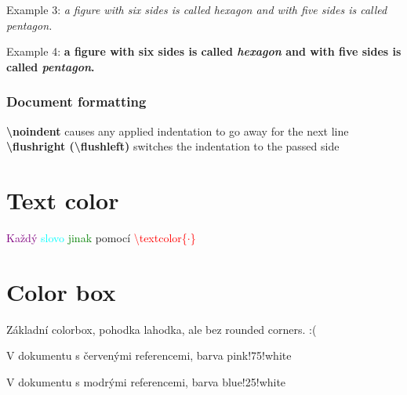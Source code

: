 \documentclass[11pt,a4paper]{report}
\theoremstyle{remark}
\theoremstyle{definition}
\begin{document}
			\noindent
			Example 3:
			\textit{ a figure with six sides is called \emph{hexagon} and with five sides is called \emph{pentagon}.}
			
			\noindent
			Example 4:
			\textbf{ a figure with six sides is called \emph{hexagon} and with five sides is called \emph{pentagon}.}
			
		\subsubsection*{Document formatting}
			
			\noindent
			\textbf{\textbackslash noindent} causes any applied indentation to go away for the next line\\
			\textbf{\textbackslash flushright (\textbackslash flushleft)} switches the indentation to the passed side
	
	\section*{Text color}
		
		\textcolor{purple}{Každý} \textcolor{cyan}{slovo} \textcolor{green}{jinak} pomocí \textcolor{red}{\textbackslash textcolor\{$\cdot$\}}
	
	\section*{Color box}
		
		\colorbox{green!40!white}{Základní colorbox, pohodka lahodka, ale bez rounded corners. :(}
		
		\begin{tcolorbox}[
			rounded corners,
			colback=pink!75!white,
			colframe=white,
			arc=1mm,
			text width=\textwidth
			]
			\color{black} V dokumentu s červenými referencemi, barva pink!75!white\\
				\lipsum[1]
		\end{tcolorbox}
	
		\begin{tcolorbox}[
			rounded corners,
			colback=blue!25!white,
			colframe=white,
			arc=1mm,
			text width=\textwidth
			]
			\color{black} V dokumentu s modrými referencemi, barva blue!25!white\\
			\lipsum[1]
		\end{tcolorbox}
		
\end{document}

